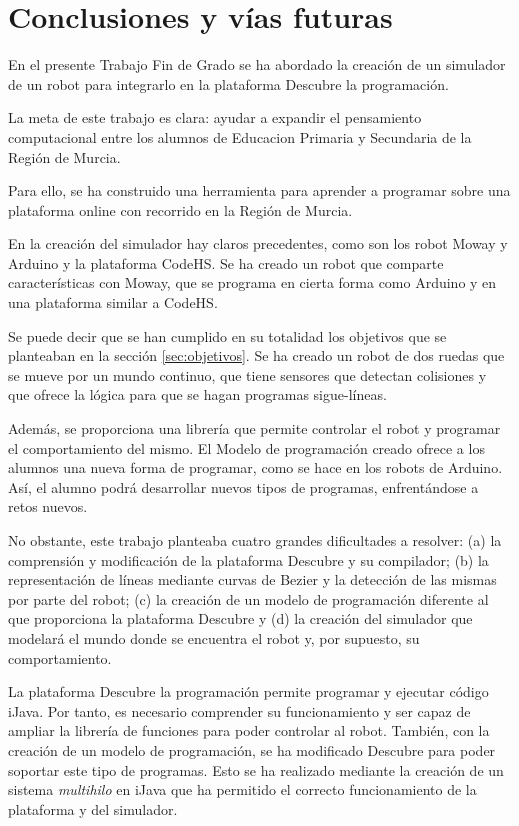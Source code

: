 \chapter{Conclusiones y vías futuras}
\label{conslusiones}


En el presente Trabajo Fin de Grado se ha abordado la creación de un simulador de un robot para integrarlo en la plataforma Descubre la programación. 

La meta de este trabajo es clara: ayudar a expandir el pensamiento computacional entre los alumnos de Educacion Primaria y Secundaria de la Región de Murcia.

Para ello, se ha construido una herramienta para aprender a programar sobre una plataforma online con recorrido en la Región de Murcia. 

En la creación del simulador hay claros precedentes, como son los robot Moway y Arduino y la plataforma CodeHS. Se ha creado un robot que comparte características con Moway, que se programa en cierta forma como Arduino y en una plataforma similar a CodeHS. 

Se puede decir que se han cumplido en su totalidad los objetivos que se planteaban en la sección \ref{sec:objetivos}. Se ha creado un robot de dos ruedas que se mueve por un mundo continuo, que tiene sensores que detectan colisiones y que ofrece la lógica para que se hagan programas sigue-líneas. 

Además, se proporciona una librería que permite controlar el robot y programar el comportamiento del mismo. El Modelo de programación creado ofrece a los alumnos una nueva forma de programar, como se hace en los robots de Arduino. Así, el alumno podrá desarrollar nuevos tipos de programas, enfrentándose a retos nuevos. 

No obstante, este trabajo planteaba cuatro grandes dificultades a resolver: (a) la comprensión y modificación de la plataforma Descubre y su compilador; (b) la representación de líneas mediante curvas de Bezier y la detección de las mismas por parte del robot; (c) la creación de un modelo de programación diferente al que proporciona la plataforma Descubre y (d) la creación del simulador que modelará el mundo donde se encuentra el robot y, por supuesto, su comportamiento.

La plataforma Descubre la programación permite programar y ejecutar código iJava. Por tanto, es necesario comprender su funcionamiento y ser capaz de ampliar la librería de funciones para poder controlar al robot. También, con la creación de un modelo de programación, se ha modificado Descubre para poder soportar este tipo de programas. Esto se ha realizado mediante la creación de un sistema \emph{multihilo} en iJava que ha permitido el correcto funcionamiento de la plataforma y del simulador. 

